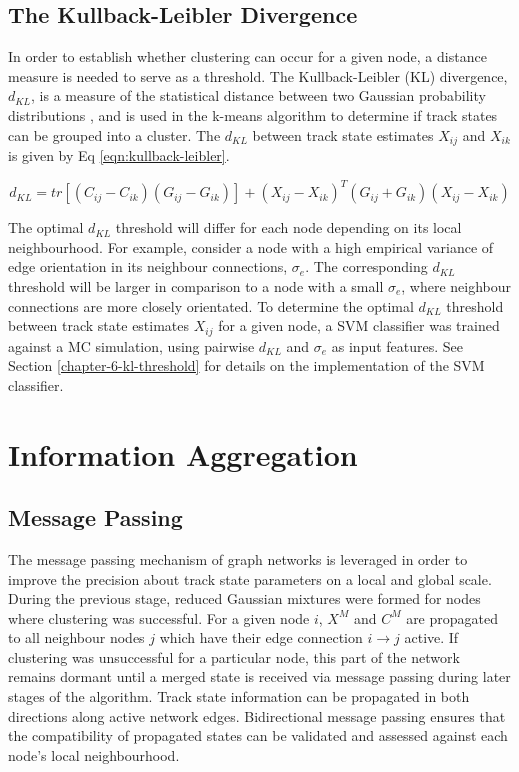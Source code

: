 \subsection{The Kullback-Leibler Divergence}
In order to establish whether clustering can occur for a given node, a distance measure is needed to serve as a threshold. The Kullback-Leibler (KL) divergence, $d_{KL}$, is a measure of the statistical distance between two Gaussian probability distributions \cite{KL, FRUHWIRTH19971}, and is used in the k-means algorithm to determine if track states can be grouped into a cluster. The $d_{KL}$ between track state estimates $X_{ij}$ and $X_{ik}$ is given by Eq \eqref{eqn:kullback-leibler}.

\begin{equation}
    d_{KL} = tr[(C_{ij} - C_{ik})(G_{ij} - G_{ik})] + (X_{ij} - X_{ik})^{T}(G_{ij} + G_{ik})(X_{ij} - X_{ik})
    \label{eqn:kullback-leibler}
\end{equation}

The optimal $d_{KL}$ threshold will differ for each node depending on its local neighbourhood. For example, consider a node with a high empirical variance of edge orientation in its neighbour connections, $\sigma_{e}$. The corresponding $d_{KL}$ threshold will be larger in comparison to a node with a small $\sigma_{e}$, where neighbour connections are more closely orientated. To determine the optimal $d_{KL}$ threshold between track state estimates $X_{ij}$ for a given node, a SVM classifier was trained against a MC simulation, using pairwise $d_{KL}$ and $\sigma_{e}$ as input features. See Section \ref{chapter-6-kl-threshold} for details on the implementation of the SVM classifier.





\section{Information Aggregation}

\subsection{Message Passing}
The message passing mechanism of graph networks is leveraged in order to improve the precision about track state parameters on a local and global scale. During the previous stage, reduced Gaussian mixtures were formed for nodes where clustering was successful. For a given node $i$, $X^M$ and $C^M$ are propagated to all neighbour nodes $j$ which have their edge connection $i \rightarrow j$ active. If clustering was unsuccessful for a particular node, this part of the network remains dormant until a merged state is received via message passing during later stages of the algorithm. Track state information can be propagated in both directions along active network edges. Bidirectional message passing ensures that the compatibility of propagated states can be validated and assessed against each node's local neighbourhood.


